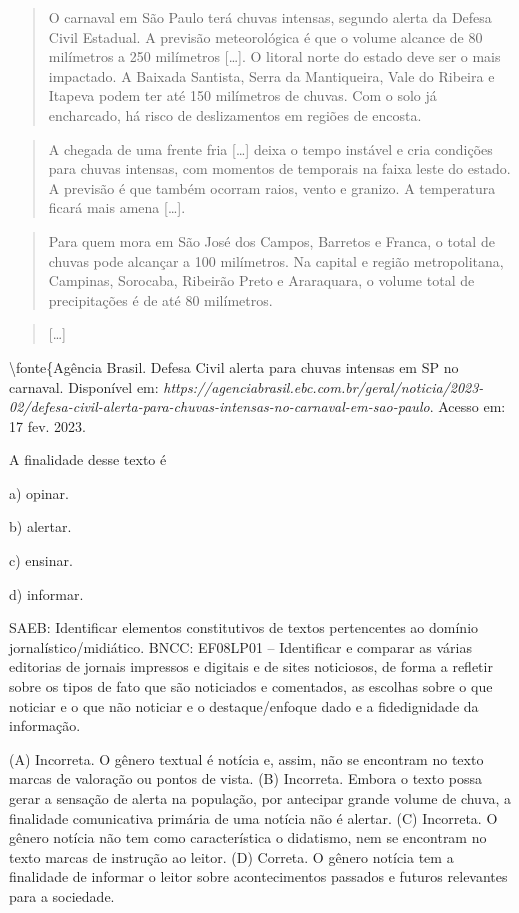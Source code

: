 \begin{quote}
O carnaval em São Paulo terá chuvas intensas, segundo alerta da Defesa
Civil Estadual. A previsão meteorológica é que o volume alcance de 80
milímetros a 250 milímetros {[}\ldots{]}. O litoral norte do estado deve
ser o mais impactado. A Baixada Santista, Serra da Mantiqueira, Vale do
Ribeira e Itapeva podem ter até 150 milímetros de chuvas. Com o solo já
encharcado, há risco de deslizamentos em regiões de encosta.
\end{quote}

\begin{quote}
A chegada de uma frente fria {[}\ldots{]} deixa o tempo instável e cria
condições para chuvas intensas, com momentos de temporais na faixa leste
do estado. A previsão é que também ocorram raios, vento e granizo. A
temperatura ficará mais amena {[}\ldots{]}.
\end{quote}

\begin{quote}
Para quem mora em São José dos Campos, Barretos e Franca, o total de
chuvas pode alcançar a 100 milímetros. Na capital e região
metropolitana, Campinas, Sorocaba, Ribeirão Preto e Araraquara, o volume
total de precipitações é de até 80 milímetros.
\end{quote}

\begin{quote}
{[}\ldots{]}
\end{quote}

\textbackslash fonte\{Agência Brasil. Defesa Civil alerta para chuvas
intensas em SP no carnaval. Disponível em:
\emph{https://agenciabrasil.ebc.com.br/geral/noticia/2023-02/defesa-civil-alerta-para-chuvas-intensas-no-carnaval-em-sao-paulo}.
Acesso em: 17 fev. 2023.

A finalidade desse texto é

a) opinar.

b) alertar.

c) ensinar.

d) informar.

SAEB: Identificar elementos constitutivos de textos pertencentes ao
domínio jornalístico/midiático. BNCC: EF08LP01 -- Identificar e comparar
as várias editorias de jornais impressos e digitais e de sites
noticiosos, de forma a refletir sobre os tipos de fato que são
noticiados e comentados, as escolhas sobre o que noticiar e o que não
noticiar e o destaque/enfoque dado e a fidedignidade da informação.

(A) Incorreta. O gênero textual é notícia e, assim, não se encontram no
texto marcas de valoração ou pontos de vista. (B) Incorreta. Embora o
texto possa gerar a sensação de alerta na população, por antecipar
grande volume de chuva, a finalidade comunicativa primária de uma
notícia não é alertar. (C) Incorreta. O gênero notícia não tem como
característica o didatismo, nem se encontram no texto marcas de
instrução ao leitor. (D) Correta. O gênero notícia tem a finalidade de
informar o leitor sobre acontecimentos passados e futuros relevantes
para a sociedade.

